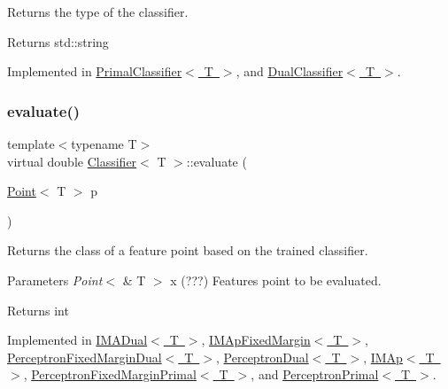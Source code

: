 Returns the type of the classifier. 

\begin{DoxyReturn}{Returns}
std\+::string 
\end{DoxyReturn}


Implemented in \mbox{\hyperlink{class_primal_classifier_a637fc3cb89994277e902758c7fc3f763}{Primal\+Classifier$<$ T $>$}}, and \mbox{\hyperlink{class_dual_classifier_af1217d4b44e417817a25157bb3f9b6d9}{Dual\+Classifier$<$ T $>$}}.

\mbox{\label{class_classifier_ab3b9544a8d9c3cbde8d5865c7e9be0fb}} 
\subsubsection{\texorpdfstring{evaluate()}{evaluate()}}
{\footnotesize\ttfamily template$<$typename T$>$ \\
virtual double \mbox{\hyperlink{class_classifier}{Classifier}}$<$ T $>$\+::evaluate (\begin{DoxyParamCaption}\item[{\mbox{\hyperlink{class_point}{Point}}$<$ T $>$}]{p }\end{DoxyParamCaption})\hspace{0.3cm}{\ttfamily [pure virtual]}}



Returns the class of a feature point based on the trained classifier. 


\begin{DoxyParams}{Parameters}
{\em Point$<$} & T $>$ x (???) Features point to be evaluated. \\
\hline
\end{DoxyParams}
\begin{DoxyReturn}{Returns}
int 
\end{DoxyReturn}


Implemented in \mbox{\hyperlink{class_i_m_a_dual_af67dfc75554d055cfdf761ee940243d7}{I\+M\+A\+Dual$<$ T $>$}}, \mbox{\hyperlink{class_i_m_ap_fixed_margin_a909eb58c78c20780494598b478f8846f}{I\+M\+Ap\+Fixed\+Margin$<$ T $>$}}, \mbox{\hyperlink{class_perceptron_fixed_margin_dual_acafabadf6d2552fde0bfb32f0344c6e3}{Perceptron\+Fixed\+Margin\+Dual$<$ T $>$}}, \mbox{\hyperlink{class_perceptron_dual_afae65908732e5f011be1d384387c71fe}{Perceptron\+Dual$<$ T $>$}}, \mbox{\hyperlink{class_i_m_ap_a41b0739cdc486e3f21e7927f1ad429a8}{I\+M\+Ap$<$ T $>$}}, \mbox{\hyperlink{class_perceptron_fixed_margin_primal_a5bfe0f03533361017b594c3fe67f0905}{Perceptron\+Fixed\+Margin\+Primal$<$ T $>$}}, and \mbox{\hyperlink{class_perceptron_primal_a547d98d8d61480d5bc44fe759c3a8e28}{Perceptron\+Primal$<$ T $>$}}.

